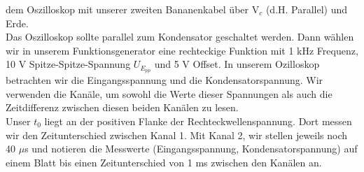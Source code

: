 dem Oszilloskop mit unserer zweiten Bananenkabel über $\si{\volt}_c$ (d.H. Parallel) und Erde.\\
Das Oszilloskop sollte parallel zum Kondensator geschaltet werden. Dann wählen wir in unserem Funktionsgenerator eine
rechteckige Funktion mit 1 kHz Frequenz, 10 V Spitze-Spitze-Spannung $U_{E_{pp}}$ und 5 V Offset. In unserem Ozilloskop betrachten wir
die Eingangsspannung und die Kondensatorspannung. Wir verwenden die Kanäle, um sowohl die Werte dieser Spannungen als
auch die Zeitdifferenz zwischen diesen beiden Kanälen zu lesen.\\
Unser $t_0$ liegt an der positiven Flanke der Rechteckwellenspannung. Dort messen wir den Zeitunterschied zwischen Kanal 1. Mit
Kanal 2, wir stellen jeweils noch 40 $\mu$s und notieren die Messwerte (Eingangsspannung, Kondensatorspannung) auf einem Blatt
bis einen Zeitunterschied von 1 ms zwischen den Kanälen an.
%
%
\newpage
